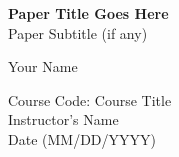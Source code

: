 \documentclass[12pt]{article}
\begin{document}
\thispagestyle{empty}

\vspace*{2in}

\begin{center}
    \textbf{Paper Title Goes Here} \\
    Paper Subtitle (if any)
    
    \vspace{10em}

    Your Name
\end{center}

\vfill

\begin{center}
    Course Code: Course Title \\
    Instructor’s Name \\
    Date (MM/DD/YYYY)
\end{center}

\newpage

\setcounter{page}{1}



%
%

%
%

\end{document}

